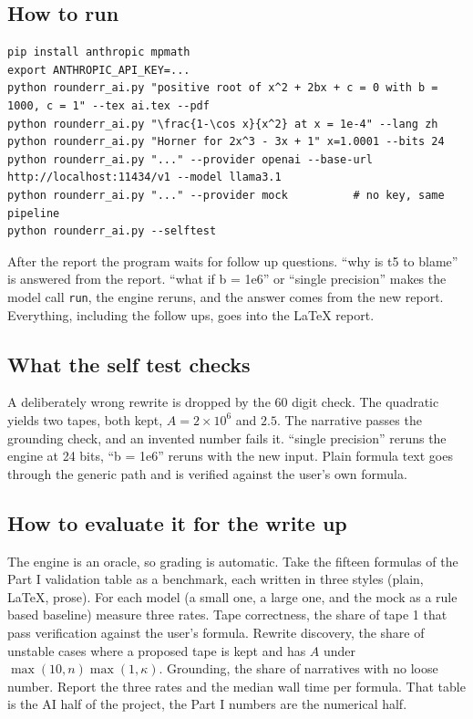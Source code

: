 \documentclass[11pt]{article}
\begin{document}
\subsection*{How to run}
\begin{lstlisting}
pip install anthropic mpmath
export ANTHROPIC_API_KEY=...
python rounderr_ai.py "positive root of x^2 + 2bx + c = 0 with b = 1000, c = 1" --tex ai.tex --pdf
python rounderr_ai.py "\frac{1-\cos x}{x^2} at x = 1e-4" --lang zh
python rounderr_ai.py "Horner for 2x^3 - 3x + 1" x=1.0001 --bits 24
python rounderr_ai.py "..." --provider openai --base-url http://localhost:11434/v1 --model llama3.1
python rounderr_ai.py "..." --provider mock          # no key, same pipeline
python rounderr_ai.py --selftest
\end{lstlisting}
After the report the program waits for follow up questions. ``why is t5 to blame'' is answered from the report. ``what if b = 1e6'' or ``single precision'' makes the model call \texttt{run}, the engine reruns, and the answer comes from the new report. Everything, including the follow ups, goes into the LaTeX report.

\subsection*{What the self test checks}
A deliberately wrong rewrite is dropped by the 60 digit check. The quadratic yields two tapes, both kept, $A = 2\times10^{6}$ and $2.5$. The narrative passes the grounding check, and an invented number fails it. ``single precision'' reruns the engine at 24 bits, ``b = 1e6'' reruns with the new input. Plain formula text goes through the generic path and is verified against the user's own formula.

\subsection*{How to evaluate it for the write up}
The engine is an oracle, so grading is automatic. Take the fifteen formulas of the Part I validation table as a benchmark, each written in three styles (plain, LaTeX, prose). For each model (a small one, a large one, and the mock as a rule based baseline) measure three rates. Tape correctness, the share of tape 1 that pass verification against the user's formula. Rewrite discovery, the share of unstable cases where a proposed tape is kept and has $A$ under $\max(10,n)\max(1,\kappa)$. Grounding, the share of narratives with no loose number. Report the three rates and the median wall time per formula. That table is the AI half of the project, the Part I numbers are the numerical half.
\end{document}
